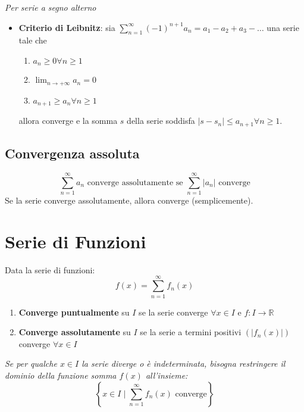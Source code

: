 \documentclass[12pt, a4paper]{article}
\begin{document}
        \textit{Per serie a segno alterno}
        \begin{itemize}
            \item \textbf{Criterio di Leibnitz}: sia $\sum_{n=1}^{\infty}(-1)^{n+1}a_n = a_1-a_2+a_3-\ldots$ una serie tale che
                \begin{enumerate}
                    \item $a_n\geq 0\forall n\geq 1$
                    \item $\lim_{n\rightarrow+\infty}a_n=0$
                    \item $a_{n+1}\geq a_n \forall n\geq 1$
                \end{enumerate}
                allora converge e la somma $s$ della serie soddisfa $\left|s-s_n\right|\leq a_{n+1}\forall n\geq 1$.
        \end{itemize}
    \subsection{Convergenza assoluta}
        \begin{equation*}
            \sum_{n=1}^{\infty}a_n \text{ converge assolutamente se } \sum_{n=1}^{\infty}\left|a_n\right| \text{ converge}
        \end{equation*}
        Se la serie converge assolutamente, allora converge (semplicemente).
\section{Serie di Funzioni}
    Data la serie di funzioni:
    \begin{equation*}
        f(x) = \sum_{n=1}^{\infty}f_n(x)
    \end{equation*}
    \begin{enumerate}
        \item \textbf{Converge puntualmente} su $I$ se la serie converge $\forall x\in I$ e $f:I\rightarrow\mathbb{R}$
        \item \textbf{Converge assolutamente} su $I$ se la serie a termini positivi $\left(\left|f_n(x)\right|\right)$ converge $\forall x\in I$
    \end{enumerate}
    \textit{Se per qualche $x\in I$ la serie diverge o è indeterminata, bisogna restringere il dominio della funzione somma $f(x)$ all'insieme:} \begin{equation*}
        \left\{x\in I \mid \sum_{n=1}^{\infty}f_n(x) \text{ converge}\right\}
    \end{equation*}
\end{document}
